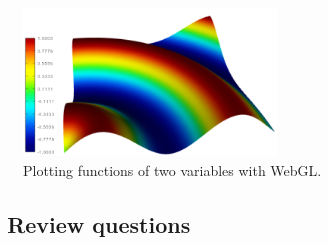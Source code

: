 \begin{figure}[!ht]
\begin{center}
\includegraphics[width=0.6\textwidth]{imgp/webgl.png}
\end{center}
\vspace{-2mm}
\caption{Plotting functions of two variables with WebGL.}
\label{fig:webgl}
\end{figure}

\subsection{\ \ Review questions}

